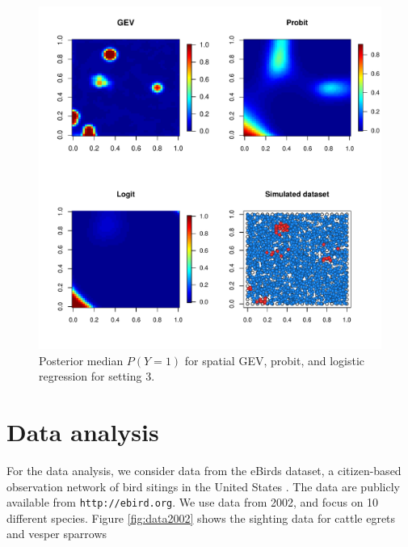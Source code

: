 \documentclass[11pt]{article}
\begin{document}
\begin{figure}
  \includegraphics[width=\linewidth]{plots/post-med-3.pdf}
  \caption{Posterior median $P(Y = 1)$ for spatial GEV, probit, and logistic regression for setting 3.}
  \label{fig:post-med-3}
\end{figure}

\section{Data analysis}\label{s:analysis}
For the data analysis, we consider data from the eBirds dataset, a citizen-based observation network of bird sitings in the United States \citep{Sullivan2009}.
The data are publicly available from {\tt http://ebird.org}.
We use data from 2002, and focus on 10 different species.
Figure \ref{fig:data2002} shows the sighting data for cattle egrets and vesper sparrows
\end{document}
